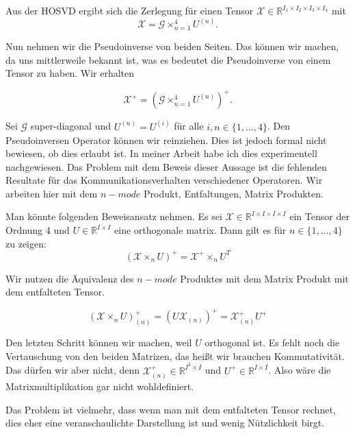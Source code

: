 Aus der HOSVD ergibt sich die Zerlegung für einen Tensor $\pmb{\mathscr{X}}  \in \mathbb{R}^{I_1 \times I_2 \times I_3 \times I_4}$  mit
\begin{equation}
\pmb{\mathscr{X}} = \pmb{\mathscr{G}} \times_{n=1}^{4} U^{ (n) }.
\end{equation}

Nun nehmen wir die Pseudoinverse von beiden Seiten. Das können wir machen, da uns mittlerweile bekannt ist, was es bedeutet die Pseudoinverse von einem Tensor zu haben. Wir erhalten

\begin{equation}
\pmb{\mathscr{X}}^{+} = (\pmb{\mathscr{G}} \times_{n=1}^{4} U^{ (n) })^+.
\end{equation}


Sei $\mathcal{G}$ super-diagonal und $U^{(n)}=U^{(i)}$ für alle $i,n \in \{1,\dots,4\}$. Den Pseudoinversen Operator können wir reinziehen. Dies ist jedoch formal nicht bewiesen, ob dies erlaubt ist. In meiner Arbeit habe ich dies experimentell nachgewiesen. Das Problem mit dem Beweis dieser Aussage ist die fehlenden Resultate für das Kommunikationsverhalten verschiedener Operatoren. Wir arbeiten hier mit dem $n-mode$ Produkt, Entfaltungen, Matrix Produkten. 

Man könnte folgenden Beweisansatz nehmen.
Es sei $\mathscr{X} \in \mathbb{R}^{I \times I \times I \times I}$ ein Tensor der Ordnung 4 und $U \in \mathbb{R}^{I \times I}$ eine orthogonale matrix.
Dann gilt es für $n \in \{1,\dots,4\}$ zu zeigen:
\begin{equation*}
(\mathscr{X} \times_n U)^+ = \mathscr{X}^+ \times_n U^T 
\end{equation*} 

Wir nutzen die Äquivalenz des $n-mode$ Produktes mit dem Matrix Produkt mit dem entfalteten Tensor.

\begin{equation*}
(\mathscr{X} \times_n U)^+ _{(n)} = ( U \mathscr{X}_{(n)} )^+ = \mathscr{X}_{(n)}^+ U^+
\end{equation*}

Den letzten Schritt können wir machen, weil $U$ orthogonal ist.
Es fehlt noch die Vertauschung von den beiden Matrizen, das heißt wir brauchen Kommutativität.
Das dürfen wir aber nicht, denn $\mathscr{X}_{(n)}^+ \in \mathbb{R}^{I^3 \times I}$ und $U^+ \in \mathbb{R}^{I \times I}$. Also wäre die Matrixmultiplikation gar nicht wohldefiniert.

Das Problem ist vielmehr, dass wenn man mit dem entfalteten Tensor rechnet, dies eher eine veranschaulichte Darstellung ist und wenig Nützlichkeit birgt.

